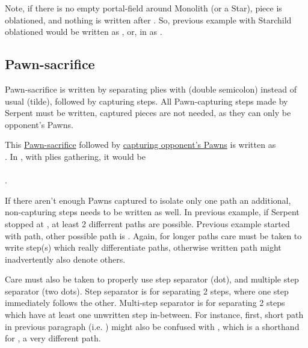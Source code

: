 Note, if there is no empty portal-field around Monolith (or a Star), piece is oblationed, and
nothing is written after \alg{||}. So, previous example with Starchild oblationed would be
written as , or, in  as \alg{[If5-c3]||}.

\subsection*{Pawn-sacrifice}
\label{sec:Appendix/Notation/Pawn-sacrifice}

Pawn-sacrifice is written by separating plies with \alg{;;} (double semicolon) instead of
usual \alg{\~{}} (tilde), followed by capturing steps. All Pawn-capturing steps made by
Serpent must be written, captured pieces are not needed, as they can only be opponent's
Pawns.

This \hyperref[fig:scn_tr_13_pawn_sacrifice_init]{Pawn-sacrifice} followed by
\hyperref[fig:scn_tr_14_pawn_sacrifice_end]{capturing opponent's Pawns} is written as \\
. In , with plies
gathering, it would be \\
\alg{[Sr14-m15]\~{}[Am15-m11];;}\\
\alg{[Sm15..m17*..m19*.l20*.m21*.n20*.o21*]}.

If there aren't enough Pawns captured to isolate only one path an additional, non-capturing
steps needs to be written as well. In previous example, if Serpent stopped at , at
least 2 differrent paths are possible. Previous example started with
 path, other possible path is .
Again, for longer paths care must be taken to write step(s) which really differentiate paths,
otherwise written path might inadvertently also denote others.

Care must also be taken to properly use step separator  (dot), and multiple step
separator  (two dots). Step separator  is for separating 2 steps, where one
step immediately follows the other. Multi-step separator  is for separating 2 steps
which have at least one unwritten step in-between. For instance, first, short path in
previous paragraph (i.e. ) might also be confused with
, which is a shorthand for
, a very different path.

